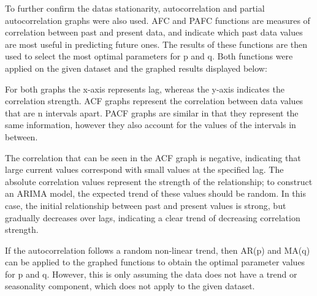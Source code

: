 \documentclass[12pt]{mcmthesis}
\begin{document}
    To further confirm the data\textquotesingle s stationarity, autocorrelation and partial autocorrelation graphs were also used. AFC and PAFC functions are measures of correlation between past and present data, and indicate which past data values are most useful in predicting future ones. The results of these functions are then used to select the most optimal parameters for p and q. Both functions were applied on the given dataset and the graphed results displayed below:

    \begin{center}
    \end{center}

    For both graphs the x-axis represents lag, whereas the y-axis indicates the correlation strength. ACF graphs represent the correlation between data values that are n intervals apart. PACF graphs are similar in that they represent the same information, however they also account for the values of the intervals in between.

    The correlation that can be seen in the ACF graph is negative, indicating that large current values correspond with small values at the specified lag. The absolute correlation values represent the strength of the relationship; to construct an ARIMA model, the expected trend of these values should be random. In this case, the initial relationship between past and present values is strong, but gradually decreases over lags, indicating a clear trend of decreasing correlation strength.

    If the autocorrelation follows a random non-linear trend, then AR(p) and MA(q) can be applied to the graphed functions to obtain the optimal parameter values for p and q.
    However, this is only assuming the data does not have a trend or seasonality component, which does not apply to the given dataset.
\end{document}

